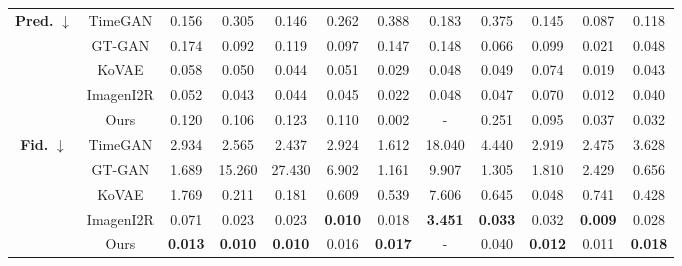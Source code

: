 \documentclass{article}
\theoremstyle{plain}
\theoremstyle{definition}
\theoremstyle{remark}
\begin{document}
\begin{table}[!t]
{\begin{tabular}{cc|cccccccccc}
    \multirow{5}{*}{\textbf{Pred.} $\downarrow$}
      & TimeGAN
         & 0.156
         & 0.305
         & 0.146
         & 0.262
         & 0.388
         & 0.183
         & 0.375
         & 0.145
         & 0.087
         & 0.118 \\
      & GT-GAN
         & 0.174
         & 0.092
         & 0.119
         & 0.097
         & 0.147
         & 0.148
         & 0.066
         & 0.099
         & 0.021
         & 0.048 \\
      & KoVAE
         & 0.058
         & 0.050
         & 0.044
         & 0.051
         & 0.029
         & 0.048
         & 0.049
         & 0.074
         & 0.019
         & 0.043 \\
      & ImagenI2R
         & 0.052
         & 0.043
         & 0.044
         & 0.045
         & 0.022
         & 0.048
         & 0.047
         & 0.070
         & 0.012
         & 0.040 \\
    & Ours
       & 0.120 & 0.106 & 0.123 & 0.110 & 0.002 & - & 0.251 & 0.095 & 0.037 & 0.032 \\
    \midrule

    \multirow{5}{*}{\textbf{Fid.} $\downarrow$}
      & TimeGAN
         & 2.934
         & 2.565
         & 2.437
         & 2.924
         & 1.612
         & 18.040
         & 4.440
         & 2.919
         & 2.475
         & 3.628 \\
      & GT-GAN
         & 1.689
         & 15.260
         & 27.430
         & 6.902
         & 1.161
         & 9.907
         & 1.305
         & 1.810
         & 2.429
         & 0.656 \\
      & KoVAE
         & 1.769
         & 0.211
         & 0.181
         & 0.609
         & 0.539
         & 7.606
         & 0.645
         & 0.048
         & 0.741
         & 0.428 \\
      & ImagenI2R
         & 0.071
         & 0.023
         & 0.023
         & \textbf{0.010}
         & 0.018
         & \textbf{3.451}
         & \textbf{0.033}
         & 0.032
         & \textbf{0.009}
         & 0.028 \\
    & Ours
       & \textbf{0.013} & \textbf{0.010} & \textbf{0.010} & 0.016 & \textbf{0.017} & - & 0.040 & \textbf{0.012} & 0.011 & \textbf{0.018} \\
    \midrule


\end{tabular}}
\end{table}
\end{document}

